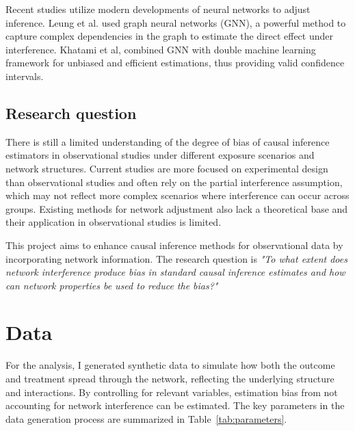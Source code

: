 \documentclass[a4paper,11pt]{article}
\begin{document}
Recent studies utilize modern developments of neural networks to adjust inference. Leung et al. \citeyear{leung2022graph} used graph neural networks (GNN), a powerful method to capture complex dependencies in the graph to estimate the direct effect under interference. Khatami et al, \citeyear{khatami2024graph} combined GNN with double machine learning framework for unbiased and efficient estimations, thus providing valid confidence intervals.

\subsection{Research question}
There is still a limited understanding of the degree of bias of causal inference estimators in observational studies under different exposure scenarios and network structures. Current studies are more focused on experimental design than observational studies and often rely on the partial interference assumption, which may not reflect more complex scenarios where interference can occur across groups. Existing methods for network adjustment also lack a theoretical base and their application in observational studies is limited. 

This project aims to enhance causal inference methods for observational data by incorporating network information. The research question is \textit{"To what extent does network interference produce bias in standard causal inference estimates and how can network properties be used to reduce the bias?"}

\section{Data}
For the analysis, I generated synthetic data to simulate how both the outcome and treatment spread through the network, reflecting the underlying structure and interactions. By controlling for relevant variables, estimation bias from not accounting for network interference can be estimated. The key parameters in the data generation process are summarized in Table~\ref{tab:parameters}.
\end{document}
